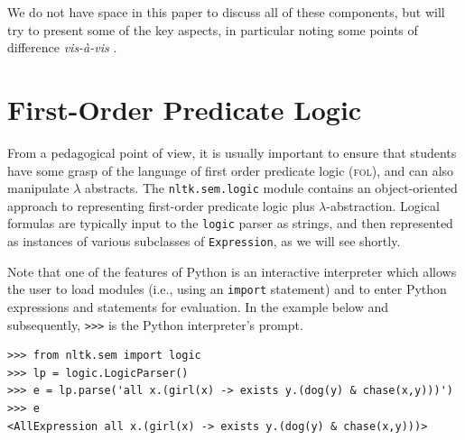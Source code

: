 \documentclass[11pt]{article}
\newcommand{\FOL}{\textsc{fol}}
\newcommand{\dhgcode}[1]{{\tt #1}}
\begin{document}
\noindent
We do not have space in this paper to discuss all of these components,
but will try to present some of the key aspects, in particular noting
some points of difference \textit{vis-\`a-vis} \citet{BB}.


\section{First-Order Predicate Logic}

From a pedagogical point of view, it is usually important to ensure
that students have some grasp of the language of first order predicate
logic (\FOL), and can also manipulate $\lambda$ abstracts.  The
\dhgcode{nltk.sem.logic} module contains an object-oriented approach
to representing first-order predicate logic plus
$\lambda$-abstraction. Logical formulas are typically input to the
\texttt{logic} parser as strings, and then represented as instances of
various subclasses of \texttt{Expression}, as we will see shortly.




Note that one of the features of Python is an interactive interpreter
which allows the user to load modules (i.e., using an \texttt{import}
statement) and to enter Python expressions and statements for
evaluation. In the example below and subsequently, \verb!>>>! is the
Python interpreter's prompt. 
\begin{verbatim}
>>> from nltk.sem import logic
>>> lp = logic.LogicParser()
>>> e = lp.parse('all x.(girl(x) -> exists y.(dog(y) & chase(x,y)))')
>>> e
<AllExpression all x.(girl(x) -> exists y.(dog(y) & chase(x,y)))>
\end{verbatim}
\end{document}
